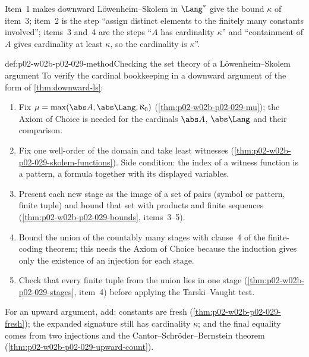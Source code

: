 Item~1 makes downward L\"owenheim--Skolem in \(\Lang^*\) give the bound
\(\kappa\) of item~3; item~2 is the step ``assign distinct elements to the
finitely many constants involved''; items~3 and~4 are the steps ``\(A\) has
cardinality \(\kappa\)'' and ``containment of \(A\) gives cardinality at
least \(\kappa\), so the cardinality is \(\kappa\)''.

\begin{hbmethod}{def:p02-w02b-p02-029-method}{Checking the set theory of a L\"owenheim--Skolem argument}
To verify the cardinal bookkeeping in a downward argument of the form of
\cref{thm:downward-ls}:
\begin{enumerate}
  \item Fix \(\mu=\max(\abs A,\abs\Lang,\aleph_0)\)
        (\cref{thm:p02-w02b-p02-029-mu}); the Axiom of Choice is needed for
        the cardinals \(\abs A\), \(\abs\Lang\) and their comparison.
  \item Fix one well-order of the domain and take least witnesses
        (\cref{thm:p02-w02b-p02-029-skolem-functions}). Side condition: the
        index of a witness function is a pattern, a formula together with
        its displayed variables.
  \item Present each new stage as the image of a set of pairs (symbol or
        pattern, finite tuple) and bound that set with products and finite
        sequences (\cref{thm:p02-w02b-p02-029-bounds}, items~3--5).
  \item Bound the union of the countably many stages with clause~4 of the
        finite-coding theorem; this needs the Axiom of Choice because the
        induction gives only the existence of an injection for each stage.
  \item Check that every finite tuple from the union lies in one stage
        (\cref{thm:p02-w02b-p02-029-stages}, item~4) before applying the
        Tarski--Vaught test.
\end{enumerate}
For an upward argument, add: constants are fresh
(\cref{thm:p02-w02b-p02-029-fresh}); the expanded signature still has
cardinality \(\kappa\); and the final equality comes from two injections and
the Cantor--Schr\"oder--Bernstein theorem
(\cref{thm:p02-w02b-p02-029-upward-count}).
\end{hbmethod}

